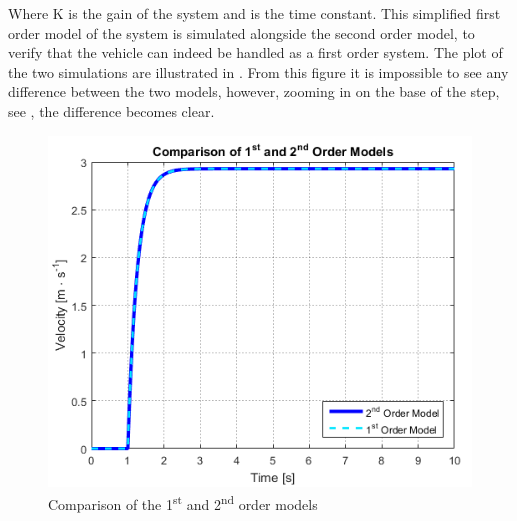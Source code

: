 %
Where \si{K} is the gain of the system and \si{\tau} is the time constant. This simplified first order model of the system is simulated alongside the second order model, to verify that the vehicle can indeed be handled as a first order system. The plot of the two simulations are illustrated in .
%
From this figure it is impossible to see any difference between the two models, however, zooming in on the base of the step, see , the difference becomes clear.
%
\begin{minipage}{\linewidth}
  	\centering
  	\begin{minipage}{0.45\linewidth}
  		\begin{figure}[H]
  			\centering
  			\includegraphics[scale = .6]{figures/ComparisonOf1stAnd2ndOrderModels.png}
  			\caption{Comparison of the \si{1^{st}} and \si{2^{nd}} order models}
  			\label{fig:ComparisonOf1stAnd2ndOrderModels}
  		\end{figure}
  	\end{minipage}
  	\hspace{0.03\linewidth}
  	\begin{minipage}{0.45\linewidth}
  	  \begin{figure}[H]
    	 	\centering

\end{figure}
\end{minipage}
\end{minipage}
